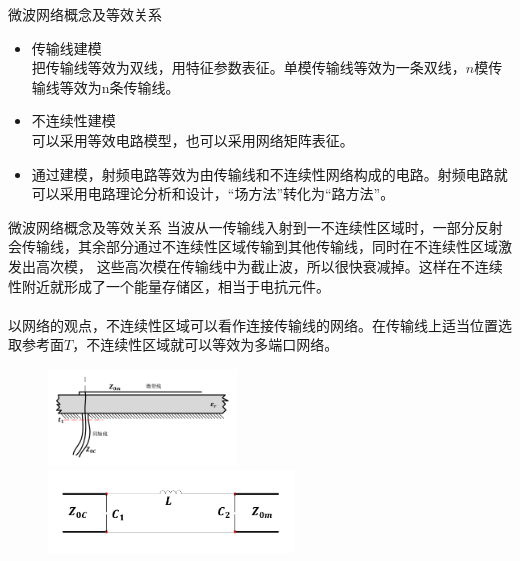 \begin{frame}{微波网络概念及等效关系}
    \begin{itemize}
        \item 传输线建模\\
              把传输线等效为双线，用特征参数表征。单模传输线等效为一条双线，$n$模传输线等效为n条传输线。
        \item 不连续性建模\\
              可以采用等效电路模型，也可以采用网络矩阵表征。
        \item 通过建模，射频电路等效为由传输线和不连续性网络构成的电路。射频电路就可以采用电路理论分析和设计，“场方法”转化为“路方法”。
    \end{itemize}
\end{frame}

\begin{frame}{微波网络概念及等效关系}
    当波从一传输线入射到一不连续性区域时，一部分反射会传输线，其余部分通过不连续性区域传输到其他传输线，同时在不连续性区域激发出高次模，
    这些高次模在传输线中为截止波，所以很快衰减掉。这样在不连续性附近就形成了一个能量存储区，相当于电抗元件。\\
    \hspace*{\fill}\\
    以网络的观点，不连续性区域可以看作连接传输线的网络。在传输线上适当位置选取参考面$T$，不连续性区域就可以等效为多端口网络。
    \begin{figure}
        \includegraphics[width=5cm]{Cha5//fig5-2.pdf}
        \includegraphics[width=6.5cm]{Cha5//fig5-3.pdf}
    \end{figure}
\end{frame}

